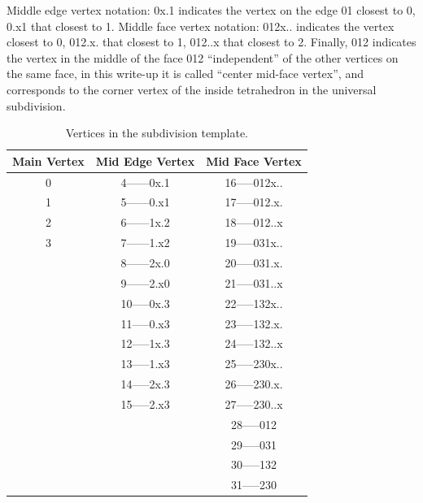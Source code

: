 Middle edge vertex notation: 0x.1 indicates the vertex on the edge 01 closest to 0, 0.x1 that closest to 1. Middle face vertex notation: 012x.. indicates the vertex closest to 0, 012.x. that closest to 1, 012..x that closest to 2. Finally, 012 indicates the vertex in the middle of the face 012 \enquote{independent} of the other vertices on the same face, in this write-up it is called \enquote{center mid-face vertex}, and corresponds to the corner vertex of the inside tetrahedron in the universal subdivision.


\begin{table}[]
\begin{center}
\begin{tabular}{|c|c|c|}
\hline
Main Vertex & Mid Edge Vertex & Mid Face Vertex \\ \hline
0           & 4------0x.1     & 16-----012x..   \\ \hline
1           & 5------0.x1     & 17-----012.x.   \\ \hline
2           & 6------1x.2     & 18-----012..x   \\ \hline
3           & 7------1.x2     & 19-----031x..   \\ \hline
            & 8------2x.0     & 20-----031.x.   \\ \hline
            & 9------2.x0     & 21-----031..x   \\ \hline
            & 10-----0x.3     & 22-----132x..   \\ \hline
            & 11-----0.x3     & 23-----132.x.   \\ \hline
            & 12-----1x.3     & 24-----132..x   \\ \hline
            & 13-----1.x3     & 25-----230x..   \\ \hline
            & 14-----2x.3     & 26-----230.x.   \\ \hline
            & 15-----2.x3     & 27-----230..x   \\ \hline
            &                 & 28-----012      \\ \hline
            &                 & 29-----031      \\ \hline
            &                 & 30-----132      \\ \hline
            &                 & 31-----230      \\ \hline
\end{tabular}
\caption{Vertices in the subdivision template. }
\label{tbl:vertices}
\end{center}
\end{table}




